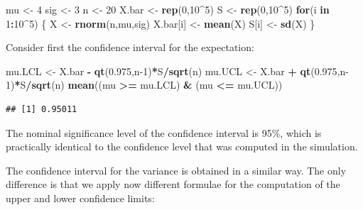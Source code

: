 \documentclass[]{krantz}
\makeatletter
\newenvironment{Shaded}{\begin{snugshade}}{\end{snugshade}}
\newcommand{\ControlFlowTok}[1]{\textcolor[rgb]{0.13,0.29,0.53}{\textbf{#1}}}
\newcommand{\DecValTok}[1]{\textcolor[rgb]{0.00,0.00,0.81}{#1}}
\newcommand{\FloatTok}[1]{\textcolor[rgb]{0.00,0.00,0.81}{#1}}
\newcommand{\KeywordTok}[1]{\textcolor[rgb]{0.13,0.29,0.53}{\textbf{#1}}}
\newcommand{\NormalTok}[1]{#1}
\newcommand{\OperatorTok}[1]{\textcolor[rgb]{0.81,0.36,0.00}{\textbf{#1}}}
\newcommand{\StringTok}[1]{\textcolor[rgb]{0.31,0.60,0.02}{#1}}
\newenvironment{kframe}{%
\medskip{}
\setlength{\fboxsep}{.8em}
 \def\at@end@of@kframe{}%
 \ifinner\ifhmode%
  \def\at@end@of@kframe{\end{minipage}}%
  \begin{minipage}{\columnwidth}%
 \fi\fi%
 \def\FrameCommand##1{\hskip\@totalleftmargin \hskip-\fboxsep
 \colorbox{shadecolor}{##1}\hskip-\fboxsep
     \hskip-\linewidth \hskip-\@totalleftmargin \hskip\columnwidth}%
 \MakeFramed {\advance\hsize-\width
   \@totalleftmargin\z@ \linewidth\hsize
   \@setminipage}}%
 {\par\unskip\endMakeFramed%
 \at@end@of@kframe}
\renewenvironment{Shaded}{\begin{kframe}}{\end{kframe}}
\theoremstyle{definition}
\theoremstyle{definition}
\theoremstyle{definition}
\theoremstyle{remark}
\makeatother
\begin{document}
\begin{Shaded}
\begin{Highlighting}[]
\NormalTok{mu <-}\StringTok{ }\DecValTok{4}
\NormalTok{sig <-}\StringTok{ }\DecValTok{3}
\NormalTok{n <-}\StringTok{ }\DecValTok{20}
\NormalTok{X.bar <-}\StringTok{ }\KeywordTok{rep}\NormalTok{(}\DecValTok{0}\NormalTok{,}\DecValTok{10}\OperatorTok{^}\DecValTok{5}\NormalTok{)}
\NormalTok{S <-}\StringTok{ }\KeywordTok{rep}\NormalTok{(}\DecValTok{0}\NormalTok{,}\DecValTok{10}\OperatorTok{^}\DecValTok{5}\NormalTok{)}
\ControlFlowTok{for}\NormalTok{(i }\ControlFlowTok{in} \DecValTok{1}\OperatorTok{:}\DecValTok{10}\OperatorTok{^}\DecValTok{5}\NormalTok{) \{}
\NormalTok{  X <-}\StringTok{ }\KeywordTok{rnorm}\NormalTok{(n,mu,sig)}
\NormalTok{  X.bar[i] <-}\StringTok{ }\KeywordTok{mean}\NormalTok{(X)}
\NormalTok{  S[i] <-}\StringTok{ }\KeywordTok{sd}\NormalTok{(X)}
\NormalTok{\}}
\end{Highlighting}
\end{Shaded}

Consider first the confidence interval for the expectation:

\begin{Shaded}
\begin{Highlighting}[]
\NormalTok{mu.LCL <-}\StringTok{ }\NormalTok{X.bar }\OperatorTok{-}\StringTok{ }\KeywordTok{qt}\NormalTok{(}\FloatTok{0.975}\NormalTok{,n}\DecValTok{-1}\NormalTok{)}\OperatorTok{*}\NormalTok{S}\OperatorTok{/}\KeywordTok{sqrt}\NormalTok{(n)}
\NormalTok{mu.UCL <-}\StringTok{ }\NormalTok{X.bar }\OperatorTok{+}\StringTok{ }\KeywordTok{qt}\NormalTok{(}\FloatTok{0.975}\NormalTok{,n}\DecValTok{-1}\NormalTok{)}\OperatorTok{*}\NormalTok{S}\OperatorTok{/}\KeywordTok{sqrt}\NormalTok{(n)}
\KeywordTok{mean}\NormalTok{((mu }\OperatorTok{>=}\StringTok{ }\NormalTok{mu.LCL) }\OperatorTok{&}\StringTok{ }\NormalTok{(mu }\OperatorTok{<=}\StringTok{ }\NormalTok{mu.UCL))}
\end{Highlighting}
\end{Shaded}

\begin{verbatim}
## [1] 0.95011
\end{verbatim}

The nominal significance level of the confidence interval is 95\%, which
is practically identical to the confidence level that was computed in
the simulation.

The confidence interval for the variance is obtained in a similar way.
The only difference is that we apply now different formulae for the
computation of the upper and lower confidence limits:
\end{document}
